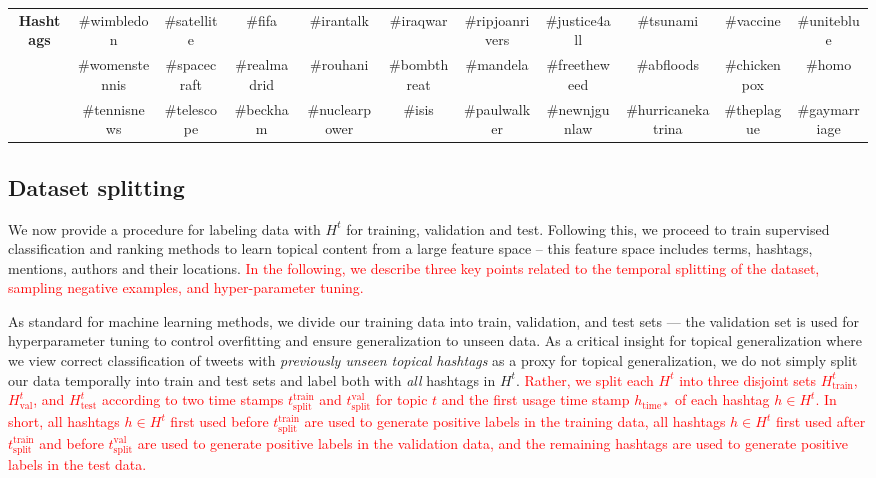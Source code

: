 \begin{table*}[t!]
{{\begin{tabular}{|c|c|c|c|c|c|c|c|c|c|c|}
\textbf{Hashtags} & \#wimbledon & \#satellite & \#fifa & \#irantalk & \#iraqwar & \#ripjoanrivers & \#justice4all & \#tsunami & \#vaccine & \#uniteblue\tabularnewline
\cline{2-11} \cline{3-11} \cline{4-11} \cline{5-11} \cline{6-11} \cline{7-11} \cline{8-11} \cline{9-11} \cline{10-11} \cline{11-11} 
 & \#womenstennis & \#spacecraft & \#realmadrid & \#rouhani & \#bombthreat & \#mandela & \#freetheweed & \#abfloods & \#chickenpox & \#homo\tabularnewline
\cline{2-11} \cline{3-11} \cline{4-11} \cline{5-11} \cline{6-11} \cline{7-11} \cline{8-11} \cline{9-11} \cline{10-11} \cline{11-11} 
 & \#tennisnews & \#telescope & \#beckham & \#nuclearpower & \#isis & \#paulwalker & \#newnjgunlaw & \#hurricanekatrina & \#theplague & \#gaymarriage\tabularnewline
\hline 
\end{tabular}

}
}
\label{table:sampleHashtags}
\end{table*}


\subsection*{Dataset splitting}


We now provide a procedure for labeling data with $H^t$ for training, validation and test.
Following this, we proceed to train supervised classification and ranking methods to learn topical content from a large feature space -- this feature space includes terms, hashtags, mentions, authors and their locations. \textcolor{red}{ In the following, we describe three key points related to the temporal splitting of the dataset, sampling negative examples, and hyper-parameter tuning.}


As standard for machine learning methods, we divide our training data into
train, validation, and test sets --- the validation set is used for hyperparameter tuning to control
overfitting and ensure generalization to unseen data.  
As a critical insight for topical generalization where we view correct classification 
of tweets with \emph{previously unseen topical hashtags} as a proxy for topical generalization, 
we do not simply
split our data temporally into train and test sets and label both with \emph{all} 
hashtags in $H^t$. \textcolor{red}{ Rather,
we split each $H^t$ into three disjoint sets $H^t_\mathrm{train}$, $H^t_\mathrm{val}$, and $H^t_\mathrm{test}$
according to two time stamps $t^\mathrm{train}_\mathrm{split}$ and $t^\mathrm{val}_\mathrm{split}$ for topic $t$ and the first usage time stamp 
$h_\mathrm{time*}$ of each hashtag $h \in H^t$.  In short, all hashtags $h \in H^t$ first used
before $t^\mathrm{train}_\mathrm{split}$ are used to generate positive labels in the training data, all hashtags $h \in H^t$ first used
after $t^\mathrm{train}_\mathrm{split}$ and before $t^\mathrm{val}_\mathrm{split}$ 
are used to generate positive labels in the validation data,  and
the remaining hashtags are used to generate positive labels in the test data.}

